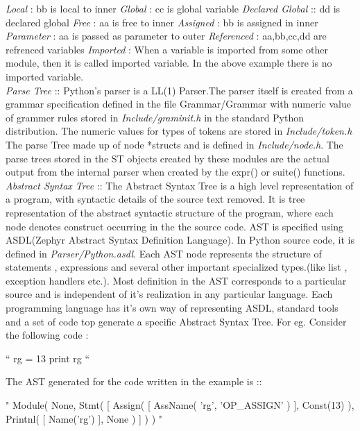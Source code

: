 \textit{Local} : bb is local to inner 
\textit{Global} : cc is global variable
\textit{Declared Global} :: dd is declared global
\textit{Free} : aa is free to inner
\textit{Assigned }: bb is assigned in inner
\textit{Parameter} : aa is passed as parameter to outer
\textit{Referenced} : aa,bb,cc,dd are refrenced variables
\textit{Imported} : When a variable is imported from some other module, then it is called imported variable. In the above example there is no imported variable.
\\
\linebreak
\textit{Parse Tree}	::	Python's parser is a LL(1) Parser.The parser itself is created from a grammar specification defined in the file Grammar/Grammar with numeric value of grammer rules stored in \textit{Include/graminit.h} in the standard Python distribution. The numeric values for types of tokens are stored in \textit{Include/token.h} The parse Tree made up of node *structs and is defined in \textit{Include/node.h}. The parse trees stored in the ST objects created by these modules are the actual output from the internal parser when created by the expr() or suite()  functions.
\\
\linebreak
\textit{Abstract Syntax Tree }	::	The Abstract Syntax Tree is a high level representation of a program, with syntactic details of the source text removed. It is tree representation of the abstract syntactic structure of the program, where each node denotes construct occurring in the the source code. AST is specified using ASDL(Zephyr Abstract Syntax Definition Language). 
In Python source code, it is defined in \textit{Parser/Python.asdl}. Each AST node represents the structure of statements , expressions and several other important specialized types.(like list , exception handlers etc.).  Most definition in the AST corresponds to a particular source and is independent of it's realization in any particular language. Each programming language has it's own way of representing ASDL, standard tools and a set of code top generate a specific Abstract Syntax Tree.
For eg. Consider the following code :
\begin{code}
“
rg = 13
print rg
“
\end{code}
\pagebreak
The AST generated for the code written in the example is ::
\begin{code}
"
Module(
	None, 
	Stmt(
		[
			Assign(
				[
					AssName(
							'rg', 'OP\_ASSIGN'
						)
				], 
				Const(13)
		 	      ), 
			Printnl(
				[
					Name('rg')
				], 
			None
			       )
		]
	    )
      )
" 
\end{code}

